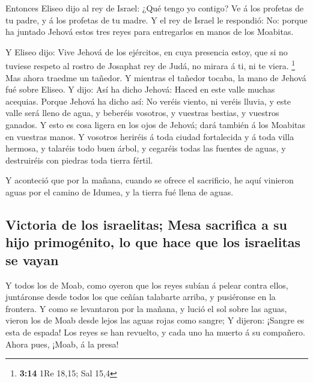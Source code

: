  Entonces Eliseo dijo al rey de Israel: ¿Qué tengo yo
contigo? Ve á los profetas de tu padre, y á los profetas de tu madre. Y
el rey de Israel le respondió: No: porque ha juntado Jehová estos tres
reyes para entregarlos en manos de los Moabitas.

 Y Eliseo dijo: Vive Jehová de los ejércitos, en cuya
presencia estoy, que si no tuviese respeto al rostro de Josaphat rey de
Judá, no mirara á ti, ni te viera. \footnote{\textbf{3:14} 1Re 18,15;
  Sal 15,4}  Mas ahora traedme un tañedor. Y mientras el
tañedor tocaba, la mano de Jehová fué sobre Eliseo.  Y
dijo: Así ha dicho Jehová: Haced en este valle muchas acequias.
 Porque Jehová ha dicho así: No veréis viento, ni veréis
lluvia, y este valle será lleno de agua, y beberéis vosotros, y vuestras
bestias, y vuestros ganados.  Y esto es cosa ligera en
los ojos de Jehová; dará también á los Moabitas en vuestras manos.
 Y vosotros heriréis á toda ciudad fortalecida y á toda
villa hermosa, y talaréis todo buen árbol, y cegaréis todas las fuentes
de aguas, y destruiréis con piedras toda tierra fértil.

 Y aconteció que por la mañana, cuando se ofrece el
sacrificio, he aquí vinieron aguas por el camino de Idumea, y la tierra
fué llena de aguas.

\hypertarget{victoria-de-los-israelitas-mesa-sacrifica-a-su-hijo-primoguxe9nito-lo-que-hace-que-los-israelitas-se-vayan}{%
\subsection{Victoria de los israelitas; Mesa sacrifica a su hijo
primogénito, lo que hace que los israelitas se
vayan}\label{victoria-de-los-israelitas-mesa-sacrifica-a-su-hijo-primoguxe9nito-lo-que-hace-que-los-israelitas-se-vayan}}

 Y todos los de Moab, como oyeron que los reyes subían á
pelear contra ellos, juntáronse desde todos los que ceñían talabarte
arriba, y pusiéronse en la frontera.  Y como se
levantaron por la mañana, y lució el sol sobre las aguas, vieron los de
Moab desde lejos las aguas rojas como sangre;  Y dijeron:
¡Sangre es esta de espada! Los reyes se han revuelto, y cada uno ha
muerto á su compañero. Ahora pues, ¡Moab, á la presa!

